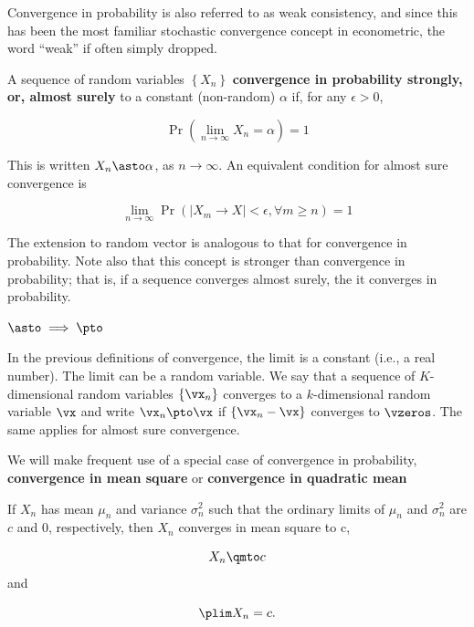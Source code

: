 \begin{remark}
Convergence in probability is also referred to as weak consistency, and since this has been the most familiar stochastic convergence concept in econometric, the word ``weak'' if often simply dropped.
\end{remark}



\begin{definition}
	A sequence of random variables $\left\{X_n\right\}$ \textbf{convergence in probability strongly, or, almost surely} to a constant (non-random) $\alpha$ if, for any $\epsilon>0$,
	
	\begin{equation*}
	 \Pr\left(\lim_{n\to \infty}X_n = \alpha\right)=1
	\end{equation*}
	
	This is written $X_n\asto \alpha$, as $n\to \infty$. An equivalent condition for almost sure convergence is
	
	\begin{equation*}
	  \lim_{n\to \infty}\Pr\left(\left|X_m \to X\right| < \epsilon, \forall m\geq n\right) = 1
	\end{equation*}
\end{definition}

The extension to random vector is analogous to that for convergence in probability. Note also that this concept is stronger than convergence in probability; that is, if a sequence converges almost surely, the it converges in probability. 

\begin{remark}
  $\asto \implies \pto$
\end{remark}


In the previous definitions of convergence, the limit is a constant (i.e., a real number). The limit can be a random variable. We say that a sequence of $K$-dimensional random variables $\left \lbrace \vx_n\right\rbrace$ converges to a $k$-dimensional random variable $\vx$ and write $\vx_n\pto \vx$ if $\left\lbrace \vx_n - \vx\right\rbrace$ converges to $\vzeros$. The same applies for almost sure convergence.


We will make frequent use of a special case of convergence in probability, \textbf{convergence in mean square} or \textbf{convergence in quadratic mean}

\begin{theorem}\label{teo:conv_qm}
If $X_n$ has mean $\mu_n$ and variance $\sigma^2_n$ such that the ordinary limits of $\mu_n$ and $\sigma^2_n$ are $c$ and 0, respectively, then $X_n$ converges in mean square to c,

\begin{equation*}
  X_n\qmto c
\end{equation*}
%
and 

\begin{equation*}
  \plim X_n = c.
\end{equation*}
\end{theorem}


